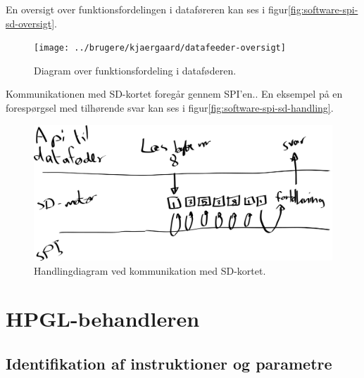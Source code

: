 En oversigt over funktionsfordelingen i
dataføreren kan ses i
figur\vref{fig:software-spi-sd-oversigt}.

\begin{figure}[htbp]
  \centering
  \texttt{[image: ../brugere/kjaergaard/datafeeder-oversigt]}
  \caption{Diagram over funktionsfordeling i dataføderen.}
  \label{fig:software-spi-sd-oversigt}
\end{figure}

Kommunikationen med SD-kortet foregår gennem SPI'en.. En eksempel på en forespørgsel med tilhørende svar
kan ses i figur\vref{fig:software-spi-sd-handling}.

\begin{figure}[htbp]
  \centering
  \includegraphics[width=\textwidth]{../brugere/kjaergaard/datafeeder-handling}
  \caption{Handlingdiagram ved kommunikation med SD-kortet.}
  \label{fig:software-spi-sd-handling}
\end{figure}


\section{HPGL-behandleren}



\subsection{Identifikation af instruktioner og parametre}




